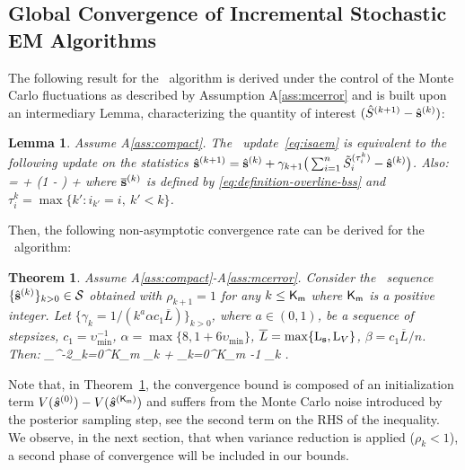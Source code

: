 \documentclass[11pt]{article}
\newtheorem{Lemma}{Lemma}
\newtheorem{Theorem}{Theorem}
\theoremstyle{t}
\begin{document}
\vspace{-0.05in}
\subsection{Global Convergence of Incremental Stochastic EM Algorithms}
\vspace{-0.05in}

The following result for the \ISAEM\ algorithm is derived under the control of the Monte Carlo fluctuations as described by Assumption A\ref{ass:mcerror} and is built upon an intermediary Lemma, characterizing the quantity of interest $( \hat{S}^{(k+1)} - \hat{\bss}^{(k)} )$:
\begin{Lemma}\label{lem:meanfield_isaem}
 Assume A\ref{ass:compact}. The \ISAEM\ update~\eqref{eq:isaem} is equivalent to the following update on the statistics $\hat{\bss}^{(k+1)} =  \hat{\bss}^{(k)}  + \gamma_{k+1} \big(  \sum_{i=1}^n \tilde{S}_i^{(\tau_i^k)} - \hat{\bss}^{(k)} \big)$.
Also:
\beq\notag
{} =  + \left(1 -  \right) \EE\left[\frac{1}{n} \sum_{i=1}^n \tilde{S}_i^{(\tau_i^k)}- \overline{\bss}^{(k)}\right]  +\EE[\eta_{i_k}^{(k+1)}]
\eeq
where $\overline{\bss}^{(k)}$ is defined by \eqref{eq:definition-overline-bss} and $\tau_i^k = \max \{ k' : i_{k'} = i,~k' < k \}$.
\end{Lemma}
Then, the following non-asymptotic convergence rate can be derived for the \ISAEM\ algorithm:
\begin{Theorem}\label{thm:isaem}
Assume A\ref{ass:compact}-A\ref{ass:mcerror}.
Consider the \ISAEM\ sequence $\{\hat{\bss}^{(k)}\}_{k>0} \in \mathcal{S}$ obtained with $\rho_{k+1}=1$ for any $k \leq {\sf K}_{\sf m }$ where ${\sf K}_{\sf m }$ is a positive integer. 
Let $\{\gamma_{k} = 1/(k^a \alpha c_1 \overline{L})\}_{k>0}$, where $a \in (0,1)$, be a sequence of stepsizes, $c_1 = \upsilon_{\min}^{-1}$, $\alpha = \max\{8, 1+6\upsilon_{\min}\}$, $\overline{L} = \max\{ \Lip{\bss} , \Lip{V} \}$, $\beta = c_1 \overline{L}/n$. Then:
\beq\notag
\upsilon_{\max}^{-2}\sum_{k=0}^{{\sf K}_{\sf m }} \tilde{\alpha}_k \EE [\|\grd V( \hs{k} )\|^2]  \leq   \EE  [V( \hs{0} ) - V( \hs{{\sf K}_{\sf m }} ) ] + \sum_{k=0}^{{\sf K}_{\sf m }-1} \tilde{\Gamma}_k         \EE [\| \eta_{i_k}^{(k)}\|^2] \eqs.
\eeq
\end{Theorem} 
Note that, in Theorem~\ref{thm:isaem}, the convergence bound is composed of an initialization term $V( \hs{0} ) - V( \hs{{\sf K}_{\sf m }} )$ and suffers from the Monte Carlo noise introduced by the posterior sampling step, see the second term on the RHS of the inequality. 
We observe, in the next section, that when variance reduction is applied ($\rho_k < 1$), a second phase of convergence will be included in our bounds.
\end{document}
